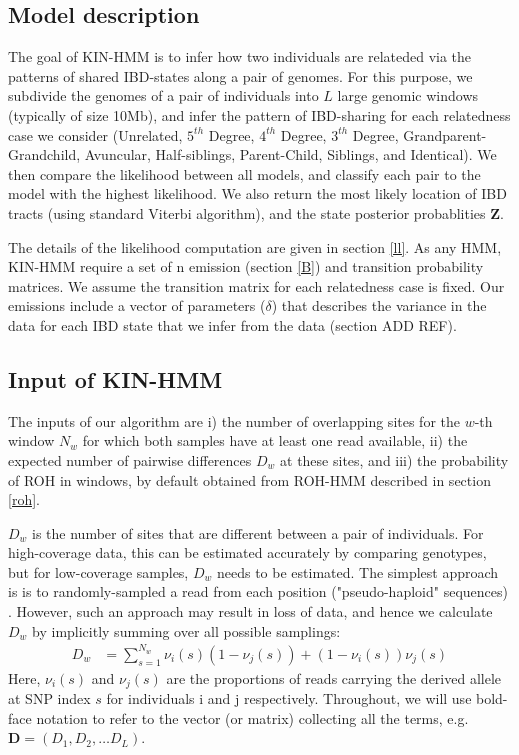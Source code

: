 \documentclass[12pt, letterpaper]{article}
\newcommand{\BZ}{\mathbf{Z}}
\newcommand{\BD}{\mathbf{D}}
\begin{document}
\subsection{Model description}\label{method_overview} 

The goal of KIN-HMM is to infer how two individuals are  relateded via the patterns of shared IBD-states along a pair of genomes. For this purpose,  we subdivide the genomes of a pair of individuals into $L$ large genomic windows (typically of size 10Mb), and infer the pattern of IBD-sharing for each relatedness case we consider (Unrelated, $5^{th}$ Degree, $4^{th}$ Degree, $3^{th}$ Degree, Grandparent-Grandchild, Avuncular, Half-siblings, Parent-Child, Siblings, and Identical). We then compare the likelihood between all models, and classify each pair to the model with the highest likelihood. We also return the most likely location of IBD tracts (using standard Viterbi algorithm), and the state posterior probablities $\BZ$. 

The details of the likelihood computation are given in section \ref{ll}. As any HMM, KIN-HMM  require a set of n emission (section \ref{B}) and transition probability matrices. We assume the transition matrix for each relatedness case is fixed. Our emissions include a vector of parameters ($\delta$) that describes the variance in the data for each IBD state that we infer from the data (section ADD REF).



\subsection{Input of KIN-HMM}\label{hmm_input}
The inputs of our algorithm are i) the number of overlapping sites for the $w$-th window $N_w$ for which both samples have at least one read available, ii) the expected number of pairwise differences $D_w$ at these sites, and iii) the probability of ROH in windows, by default obtained from ROH-HMM described in section \ref{roh}.

$D_w$ is the number of sites that are different between a pair of individuals. For high-coverage data, this can be estimated accurately by comparing genotypes, but for low-coverage samples, $D_w$ needs to be estimated. The simplest approach is is to  randomly-sampled a read from each position ("pseudo-haploid" sequences) \cite{haak_massive_2015}. However, such an approach may result in loss of data, and hence we calculate $D_w$ by implicitly summing over all possible samplings:
\begin{align}\label{eq:x}
D_w &= \sum_{s=1}^{N_w} \nu_i(s) (1-\nu_j(s)) + (1-\nu_i(s)) \nu_j(s)
\end{align}
Here, $\nu_i(s)$ and $\nu_j(s)$ are the proportions of reads carrying the derived allele at SNP index $s$ for individuals i and j respectively.
Throughout, we will use bold-face notation to refer to the vector (or matrix) collecting  all the terms, e.g. $\BD = (D_1, D_2, \dots D_L)$. 
\end{document}

